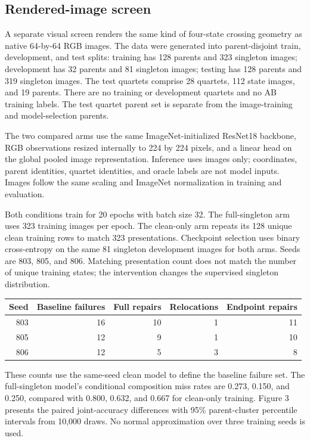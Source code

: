 \hypertarget{rendered-image-screen}{%
\subsection{Rendered-image screen}\label{rendered-image-screen}}

A separate visual screen renders the same kind of four-state crossing geometry as native 64-by-64 RGB images. The data were generated into parent-disjoint train, development, and test splits: training has 128 parents and 323 singleton images; development has 32 parents and 81 singleton images; testing has 128 parents and 319 singleton images. The test quartets comprise 28 quartets, 112 state images, and 19 parents. There are no training or development quartets and no AB training labels. The test quartet parent set is separate from the image-training and model-selection parents.

The two compared arms use the same ImageNet-initialized ResNet18 backbone, RGB observations resized internally to 224 by 224 pixels, and a linear head on the global pooled image representation. Inference uses images only; coordinates, parent identities, quartet identities, and oracle labels are not model inputs. Images follow the same scaling and ImageNet normalization in training and evaluation.

Both conditions train for 20 epochs with batch size 32. The full-singleton arm uses 323 training images per epoch. The clean-only arm repeats its 128 unique clean training rows to match 323 presentations. Checkpoint selection uses binary cross-entropy on the same 81 singleton development images for both arms. Seeds are 803, 805, and 806. Matching presentation count does not match the number of unique training states; the intervention changes the supervised singleton distribution.

\begin{longtable}[]{@{}rrrrr@{}}
\toprule
Seed & Baseline failures & Full repairs & Relocations & Endpoint repairs\tabularnewline
\midrule
\endhead
803 & 16 & 10 & 1 & 11\tabularnewline
805 & 12 & 9 & 1 & 10\tabularnewline
806 & 12 & 5 & 3 & 8\tabularnewline
\bottomrule
\end{longtable}

These counts use the same-seed clean model to define the baseline failure set. The full-singleton model's conditional composition miss rates are 0.273, 0.150, and 0.250, compared with 0.800, 0.632, and 0.667 for clean-only training. Figure 3 presents the paired joint-accuracy differences with 95\% parent-cluster percentile intervals from 10,000 draws. No normal approximation over three training seeds is used.

